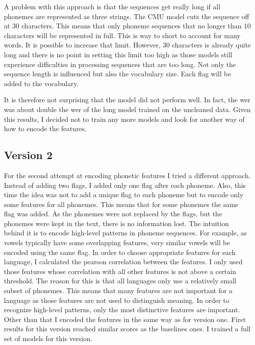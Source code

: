 A problem with this approach is that the sequences get really long if all phonemes are represented as three strings. The CMU model cuts the sequence off at 30 characters. This means that only phoneme sequences that no longer than 10 characters will be represented in full. This is way to short to account for many words. It is possible to increase that limit. However, 30 characters is already quite long and there is no point in setting this limit too high as those models still experience difficulties in processing sequences that are too long. Not only the sequence length is influenced but also the vocabulary size. Each flag will be added to the vocabulary.  

It is therefore not surprising that the model did not perform well. In fact, the \ac{wer} was about double the \ac{wer} of the long model trained on the uncleaned data. Given this results, I decided not to train any more models and look for another way of how to encode the features.

\subsection*{Version 2}
For the second attempt at encoding phonetic features I tried a different approach. Instead of adding two flags, I added only one flag after each phoneme. Also, this time the idea was not to add a unique flag to each phoneme but to encode only some features for all phonemes. This means that for some phonemes the same flag was added. As the phonemes were not replaced by the flags, but the phonemes were kept in the text, there is no information lost. The intuition behind it is to encode high-level patterns in phoneme sequences. For example, as vowels typically have some overlapping features, very similar vowels will be encoded using the same flag. In order to choose appropriate features for each language, I calculated the pearson correlation between the features. I only used those features whose correlation with all other features is not above a certain threshold. The reason for this is that all languages only use a relatively small subset of phonemes. This means that many features are not important for a language as those features are not used to distinguish meaning. In order to recognize high-level patterns, only the most distinctive features are important. Other than that I encoded the features in the same way as for version one. First results for this version reached similar scores as the baselines ones. I trained a full set of models for this version.

